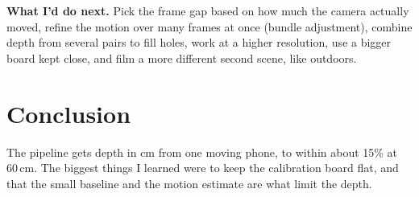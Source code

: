 \documentclass[conference]{assets/latex/IEEEtran}
\begin{document}
\textbf{What I'd do next.} Pick the frame gap based on how much the camera
actually moved, refine the motion over many frames at once (bundle
adjustment), combine depth from several pairs to fill holes, work at a higher
resolution, use a bigger board kept close, and film a more different second
scene, like outdoors.

\section{Conclusion}
The pipeline gets depth in cm from one moving phone, to within about 15\% at
60\,cm. The biggest things I learned were to keep the calibration board flat,
and that the small baseline and the motion estimate are what limit the depth.

\nocite{foundationsCVbook}
\printbibliography
\end{document}
